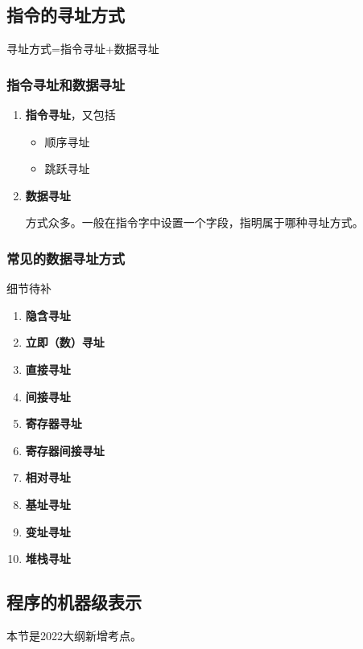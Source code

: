 \documentclass[12pt, a4paper, oneside]{ctexart}
\begin{document}
\subsection{指令的寻址方式}

寻址方式=指令寻址+数据寻址

\subsubsection{指令寻址和数据寻址}

\begin{enumerate}
  \item {\bf 指令寻址}，又包括
  \begin{itemize}
    \item 顺序寻址
    \item 跳跃寻址
  \end{itemize}
  \item {\bf 数据寻址}
  
  方式众多。一般在指令字中设置一个字段，指明属于哪种寻址方式。
\end{enumerate}

\subsubsection{常见的数据寻址方式}

细节待补

\begin{enumerate}
  \item {\bf 隐含寻址}
  \item {\bf 立即（数）寻址}
  \item {\bf 直接寻址}
  \item {\bf 间接寻址}
  \item {\bf 寄存器寻址}
  \item {\bf 寄存器间接寻址}
  \item {\bf 相对寻址}
  \item {\bf 基址寻址}
  \item {\bf 变址寻址}
  \item {\bf 堆栈寻址}
\end{enumerate}

\subsection{程序的机器级表示}

本节是2022大纲新增考点。
\end{document}
